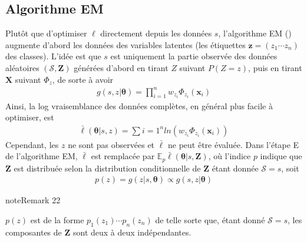 \documentclass[letterpaper,10pt,english]{jupyterBook}
\begin{document}
\subsection{Algorithme EM}
\label{\detokenize{clustering:algorithme-em}}
\sphinxAtStartPar
Plutôt que d’optimiser \(\ell\) directement depuis les données \(s\), l’algorithme EM ({\hyperref[\detokenize{clustering:EM}]{}}) augmente d’abord les données des variables latentes (les étiquettes \(\mathbf z=(z_1\cdots z_n)\) des classes). L’idée est que \(s\) est uniquement la partie observée des données aléatoires \((\mathcal S,\mathbf Z)\) générées d’abord en tirant \(Z\) suivant \(P(Z=z)\), puis en tirant \(\mathbf X\) suivant \(\Phi_z\), de sorte à avoir
\begin{equation*}
\begin{split}g(s,z|\boldsymbol \theta) = \displaystyle\prod_{i=1}^n w_{z_i} \Phi_{z_i}(\mathbf x_i)\end{split}
\end{equation*}
\sphinxAtStartPar
Ainsi, la log vraisemblance des données complètes, en général plus facile à optimiser, est
\begin{equation*}
\begin{split}\bar\ell(\boldsymbol\theta|s,z) =\displaystyle\sum{i=1}^n ln(w_{z_i} \Phi_{z_i}(\mathbf x_i))\end{split}
\end{equation*}
\sphinxAtStartPar
Cependant, les \(z\) ne sont pas observées et \(\bar\ell\) ne peut être évaluée. Dans l’étape E de l’algorithme EM, \(\bar\ell\) est remplacée par \(\mathbb{E}_p \bar\ell(\boldsymbol \theta |s,\mathbf Z)\), où l’indice \(p\) indique que \(\mathbf Z\) est distribuée selon la distribution conditionnelle de \(\mathbf Z\) étant donnée \(\mathcal S=s\), soit
\begin{equation*}
\begin{split}p(z)=g(z|s,\boldsymbol \theta) \propto g(s,z|\boldsymbol \theta)\end{split}
\end{equation*}\label{clustering:remark-7}
\begin{sphinxadmonition}{note}{Remark 22}



\sphinxAtStartPar
\(p(z)\) est de la forme \(p_1(z_1)\cdots p_n(z_n)\) de telle sorte que, étant donné \(\mathcal S=s\), les composantes de \(\mathbf Z\) sont deux à deux indépendantes.
\end{sphinxadmonition}
\label{clustering:EM}
\end{document}
